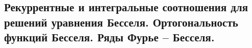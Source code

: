 \subsection{Рекуррентные и интегральные соотношения для решений уравнения Бесселя. Ортогональность функций Бесселя. Ряды Фурье – Бесселя.}
\label{sec:bessel}

